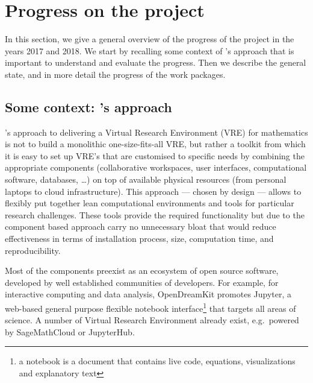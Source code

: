 \documentclass{deliverablereport}
\author{Nicolas M. Thiéry, Benoît Pilorget, et al.}
\begin{document}
\enlargethispage{4ex}
\maketitle
\githubissuedescription
\tableofcontents\newpage






\section{Progress on the project}

In this section, we give a general overview of the progress of the
project in the years 2017 and 2018. We start by recalling some context of \ODK's
approach that is important to understand and evaluate the
progress. Then we describe the general state, and in more detail
the progress of the work packages.

\subsection{Some context: \ODK's approach}
\ODK's approach to delivering a Virtual Research Environment (VRE) for
mathematics is not to build a monolithic one-size-fits-all VRE, but
rather a toolkit from which it is easy to set up VRE's that are
customised to specific needs by combining the appropriate components
(collaborative workspaces, user interfaces, computational software,
databases, \dots) on top of available physical resources (from
personal laptops to cloud infrastructure). This approach --- chosen by
design --- allows to flexibly put together lean computational
environments and tools for particular research challenges. These tools
provide the required functionality but due to the component based
approach carry no unnecessary bloat that would reduce effectiveness in
terms of installation process, size, computation time, and
reproducibility.

Most of the components preexist as an ecosystem of open source
software, developed by well established communities of developers. For
example, for interactive computing and data analysis, OpenDreamKit
promotes Jupyter, a web-based general purpose flexible notebook
interface\footnote{a notebook is a document that contains live code,
  equations, visualizations and explanatory text} that targets all
areas of science. A number of Virtual Research Environment already
exist, e.g.\ powered by SageMathCloud or JupyterHub.
\end{document}
